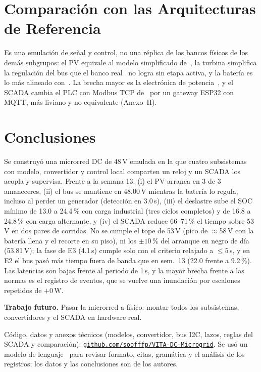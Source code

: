 \documentclass[conference]{IEEEtran}
\begin{document}
\section{Comparación con las Arquitecturas de Referencia}

Es una emulación de señal y control, no una réplica de los bancos físicos de los demás subgrupos: el PV equivale al modelo simplificado de~\cite{aristizabal2026pv}, la turbina simplifica la regulación del bus que el banco real~\cite{gonzalez2026eolica} no logra sin etapa activa, y la batería es lo más alineado con~\cite{vega2026bateria}. La brecha mayor es la electrónica de potencia~\cite{pinto2026peb}, y el SCADA cambia el PLC con Modbus TCP de~\cite{alvarez2026scada} por un gateway ESP32 con MQTT, más liviano y no equivalente (Anexo~H).

\section{Conclusiones}

Se construyó una microrred DC de 48\,V emulada en la que cuatro subsistemas con modelo, convertidor y control local comparten un reloj y un SCADA los acopla y supervisa. Frente a la semana 13: (i) el PV arranca en 3 de 3 amaneceres, (ii) el bus se mantiene en 48.00\,V mientras la batería lo regula, incluso al perder un generador (detección en 3.0\,s), (iii) el deslastre sube el SOC mínimo de 13.0 a 24.4\,\% con carga industrial (tres ciclos completos) y de 16.8 a 24.8\,\% con carga alternante, y (iv) el SCADA reduce 66--71\,\% el tiempo sobre 53\,V en dos pares de corridas. No se cumple el tope de 53\,V (pico de $\approx$58\,V con la batería llena y el recorte en su piso), ni los $\pm10$\,\% del arranque en negro de día (53.81\,V); la fase de E3 (4.1\,s) cumple solo con el criterio relajado a $\le5$\,s, y en E2 el bus pasó más tiempo fuera de banda que en sem.~13 (22.0 frente a 9.2\,\%). Las latencias son bajas frente al periodo de 1\,s, y la mayor brecha frente a las normas es el registro de eventos, que se vuelve una inundación por escalones repetidos de $+0$\,W.

\textbf{Trabajo futuro.} Pasar la microrred a físico: montar todos los subsistemas, convertidores y el SCADA en hardware real.

Código, datos y anexos técnicos (modelos, convertidor, bus I2C, lazos, reglas del SCADA y comparación): \href{https://github.com/soofffp/VITA-DC-Microgrid}{\texttt{github.com/soofffp/VITA-DC-Microgrid}}. Se usó un modelo de lenguaje~\cite{anthropic2026claude} para revisar formato, citas, gramática y el análisis de los registros; los datos y las conclusiones son de los autores.
\end{document}
